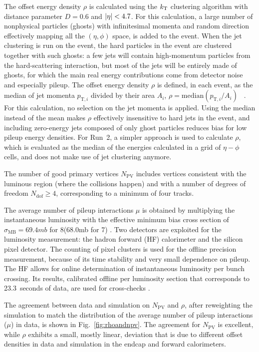\documentclass[11pt,twoside,a4paper,cmspaper,final,collab]{cms-tdr}
\begin{document}
The offset energy density $\rho$ is calculated using the $k_{\mathrm{T}}$ clustering algorithm \cite{KT1,KT2,KT3} with distance parameter $D=0.6$ and $\lvert \eta \rvert<4.7$.
For this calculation, a large number of nonphysical particles (ghosts) with infinitesimal momenta and random direction effectively mapping all the $(\eta,\phi)$ space, is added to the event. When the jet clustering is run on the event, the hard particles in the event are clustered together with such ghosts: a few jets will contain high-momentum particles from the hard-scattering interaction, but most of the jets will be entirely made of ghosts, for which the main real energy contributions come from detector noise and especially pileup.
The offset energy density $\rho$ is defined, in each event, as the median of jet momenta $p_{\mathrm{T},i}$ divided by their area $A_i$, $\rho = \mathrm{ median}(p_{\mathrm{T},i}/A_i)$ ~\cite{Cacciari:2007fd}. For this calculation, no selection on the jet momenta is applied. Using the median instead of the mean makes $\rho$ effectively insensitive to hard jets in the event, and including zero-energy jets composed of only ghost particles reduces bias for low pileup energy densities.
For Run~2, a simpler approach is used to calculate $\rho$, which is evaluated as the median of the energies calculated in a grid of $\eta-\phi$ cells, and does not make use of jet clustering anymore.

The number of good primary vertices $N_\mathrm{PV}$ includes vertices consistent with the luminous region (where the collisions happen) and with a number of degrees of freedom $N_\mathrm{dof}\geq 4$, corresponding to a minimum of four tracks.

The average number of pileup interactions $\mu$ is obtained by multiplying the instantaneous luminosity with the effective minimum bias cross section of $\sigma_\mathrm{ MB}=69.4\unit{mb}$ for 8\TeV (68.0\unit{mb} for 7\TeV) \cite{Chatrchyan:2012nj}. Two detectors are exploited for the luminosity measurement: the hadron forward (HF) calorimeter and the silicon pixel detector. The counting of pixel clusters is used for the offline precision measurement, because of its time stability and very small dependence on pileup. The HF allows for online determination of instantaneous luminosity per bunch crossing. Its results, calibrated offline per luminosity section that corresponds to 23.3~seconds of data, are used for cross-checks \cite{CMS-PAS-LUM-13-001}.

The agreement between data and simulation on $N_\mathrm{PV}$ and $\rho$, after reweighting the simulation to match the distribution of the average number of pileup interactions ($\mu$) in data, is shown in Fig.~\ref{fig:rhoandnpv}. The agreement for $N_\mathrm{PV}$ is excellent, while $\rho$ exhibits a small, mostly linear, deviation that is due to different offset densities in data and simulation in the endcap and forward calorimeters.
\end{document}
